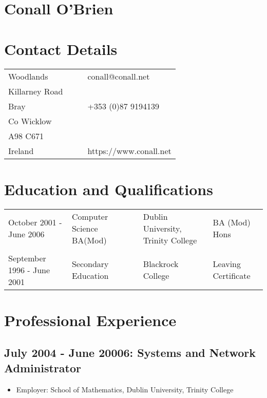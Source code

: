 \documentclass[a4paper, 11pt] {article}
\begin{document}
\section*{Conall O'Brien}

\section*{Contact Details}

\begin{tabular}{l l l l}
Woodlands		&	&			& conall@conall.net 	  	\\
Killarney Road		&	&			&				\\
Bray	 		&	&			& +353 (0)87 9194139 		\\
Co Wicklow		&	&			& 				\\
A98 C671		&	&			& 				\\
Ireland			&  	&			& https://www.conall.net	\\
\end{tabular}

\section*{Education and Qualifications}

\begin{tabular}{l l l l l}
October 2001 - June 2006 	& Computer Science BA(Mod) &	& Dublin University, Trinity College & BA (Mod) Hons \\
			 	&			   &	&				     &		     \\
September 1996 - June 2001	& Secondary Education	   &	& Blackrock College	& Leaving Certificate	     \\
\end{tabular}

\section*{Professional Experience}

\subsection*{July 2004 - June 20006: Systems and Network Administrator}

\begin{itemize}
\item Employer: School of Mathematics, Dublin University, Trinity College
\end{itemize}
\end{document}
